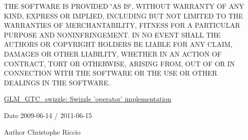 \-T\-H\-E \-S\-O\-F\-T\-W\-A\-R\-E \-I\-S \-P\-R\-O\-V\-I\-D\-E\-D \char`\"{}\-A\-S I\-S\char`\"{}, \-W\-I\-T\-H\-O\-U\-T \-W\-A\-R\-R\-A\-N\-T\-Y \-O\-F \-A\-N\-Y \-K\-I\-N\-D, \-E\-X\-P\-R\-E\-S\-S \-O\-R \-I\-M\-P\-L\-I\-E\-D, \-I\-N\-C\-L\-U\-D\-I\-N\-G \-B\-U\-T \-N\-O\-T \-L\-I\-M\-I\-T\-E\-D \-T\-O \-T\-H\-E \-W\-A\-R\-R\-A\-N\-T\-I\-E\-S \-O\-F \-M\-E\-R\-C\-H\-A\-N\-T\-A\-B\-I\-L\-I\-T\-Y, \-F\-I\-T\-N\-E\-S\-S \-F\-O\-R \-A \-P\-A\-R\-T\-I\-C\-U\-L\-A\-R \-P\-U\-R\-P\-O\-S\-E \-A\-N\-D \-N\-O\-N\-I\-N\-F\-R\-I\-N\-G\-E\-M\-E\-N\-T. \-I\-N \-N\-O \-E\-V\-E\-N\-T \-S\-H\-A\-L\-L \-T\-H\-E \-A\-U\-T\-H\-O\-R\-S \-O\-R \-C\-O\-P\-Y\-R\-I\-G\-H\-T \-H\-O\-L\-D\-E\-R\-S \-B\-E \-L\-I\-A\-B\-L\-E \-F\-O\-R \-A\-N\-Y \-C\-L\-A\-I\-M, \-D\-A\-M\-A\-G\-E\-S \-O\-R \-O\-T\-H\-E\-R \-L\-I\-A\-B\-I\-L\-I\-T\-Y, \-W\-H\-E\-T\-H\-E\-R \-I\-N \-A\-N \-A\-C\-T\-I\-O\-N \-O\-F \-C\-O\-N\-T\-R\-A\-C\-T, \-T\-O\-R\-T \-O\-R \-O\-T\-H\-E\-R\-W\-I\-S\-E, \-A\-R\-I\-S\-I\-N\-G \-F\-R\-O\-M, \-O\-U\-T \-O\-F \-O\-R \-I\-N \-C\-O\-N\-N\-E\-C\-T\-I\-O\-N \-W\-I\-T\-H \-T\-H\-E \-S\-O\-F\-T\-W\-A\-R\-E \-O\-R \-T\-H\-E \-U\-S\-E \-O\-R \-O\-T\-H\-E\-R \-D\-E\-A\-L\-I\-N\-G\-S \-I\-N \-T\-H\-E \-S\-O\-F\-T\-W\-A\-R\-E.

\hyperlink{group__gtc__swizzle}{\-G\-L\-M\-\_\-\-G\-T\-C\-\_\-swizzle\-: \-Swizzle 'operator' implementation}

\begin{DoxyDate}{\-Date}
2009-\/06-\/14 / 2011-\/06-\/15 
\end{DoxyDate}
\begin{DoxyAuthor}{\-Author}
\-Christophe \-Riccio 
\end{DoxyAuthor}
